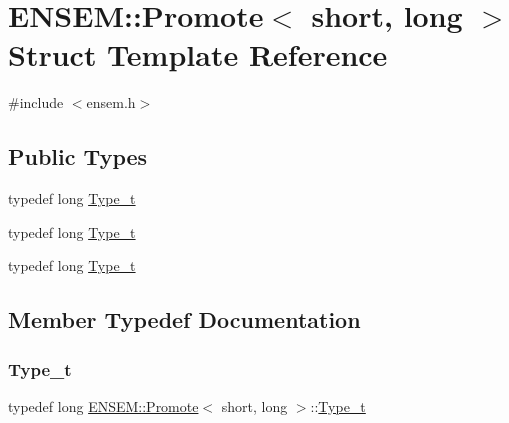 \hypertarget{structENSEM_1_1Promote_3_01short_00_01long_01_4}{}\section{E\+N\+S\+EM\+:\+:Promote$<$ short, long $>$ Struct Template Reference}
\label{structENSEM_1_1Promote_3_01short_00_01long_01_4}


{\ttfamily \#include $<$ensem.\+h$>$}

\subsection*{Public Types}
\begin{DoxyCompactItemize}
\item 
typedef long \mbox{\hyperlink{structENSEM_1_1Promote_3_01short_00_01long_01_4_a560571e93323f728261d16b19c7d0df7}{Type\+\_\+t}}
\item 
typedef long \mbox{\hyperlink{structENSEM_1_1Promote_3_01short_00_01long_01_4_a560571e93323f728261d16b19c7d0df7}{Type\+\_\+t}}
\item 
typedef long \mbox{\hyperlink{structENSEM_1_1Promote_3_01short_00_01long_01_4_a560571e93323f728261d16b19c7d0df7}{Type\+\_\+t}}
\end{DoxyCompactItemize}


\subsection{Member Typedef Documentation}
\mbox{\label{structENSEM_1_1Promote_3_01short_00_01long_01_4_a560571e93323f728261d16b19c7d0df7}} 
\subsubsection{\texorpdfstring{Type\_t}{Type\_t}\hspace{0.1cm}{\footnotesize\ttfamily [1/3]}}
{\footnotesize\ttfamily typedef long \mbox{\hyperlink{structENSEM_1_1Promote}{E\+N\+S\+E\+M\+::\+Promote}}$<$ short, long $>$\+::\mbox{\hyperlink{structENSEM_1_1Promote_3_01short_00_01long_01_4_a560571e93323f728261d16b19c7d0df7}{Type\+\_\+t}}}

